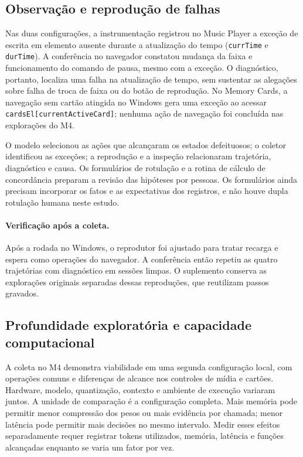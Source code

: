 \documentclass[12pt]{article}
\begin{document}
\subsection{Observação e reprodução de falhas}
Nas duas configurações, a instrumentação registrou no Music Player a exceção de escrita em elemento ausente durante a atualização do tempo (\texttt{currTime} e \texttt{durTime}). A conferência no navegador constatou mudança da faixa e funcionamento do comando de pausa, mesmo com a exceção. O diagnóstico, portanto, localiza uma falha na atualização de tempo, sem sustentar as alegações sobre falha de troca de faixa ou do botão de reprodução. No Memory Cards, a navegação sem cartão atingida no Windows gera uma exceção ao acessar \texttt{cardsEl[currentActiveCard]}; nenhuma ação de navegação foi concluída nas explorações do M4.

O modelo selecionou as ações que alcançaram os estados defeituosos; o coletor identificou as exceções; a reprodução e a inspeção relacionaram trajetória, diagnóstico e causa. Os formulários de rotulação e a rotina de cálculo de concordância preparam a revisão das hipóteses por pessoas. Os formulários ainda precisam incorporar os fatos e as expectativas dos registros, e não houve dupla rotulação humana neste estudo.

\paragraph{Verificação após a coleta.} Após a rodada no Windows, o reprodutor foi ajustado para tratar recarga e espera como operações do navegador. A conferência então repetiu as quatro trajetórias com diagnóstico em sessões limpas. O suplemento conserva as explorações originais separadas dessas reproduções, que reutilizam passos gravados.

\subsection{Profundidade exploratória e capacidade computacional}\label{sec:depth}
A coleta no M4 demonstra viabilidade em uma segunda configuração local, com operações comuns e diferenças de alcance nos controles de mídia e cartões. Hardware, modelo, quantização, contexto e ambiente de execução variaram juntos. A unidade de comparação é a configuração completa. Mais memória pode permitir menor compressão dos pesos ou mais evidência por chamada; menor latência pode permitir mais decisões no mesmo intervalo. Medir esses efeitos separadamente requer registrar tokens utilizados, memória, latência e funções alcançadas enquanto se varia um fator por vez.
\end{document}
